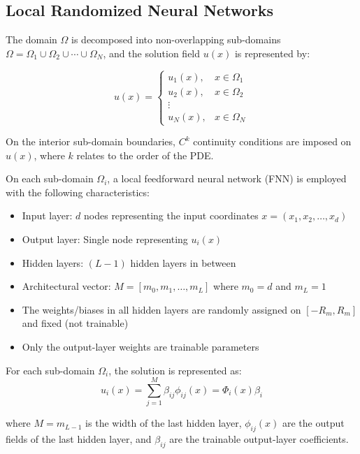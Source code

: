 \documentclass[11pt,a4paper]{article}
\begin{document}
\subsection{Local Randomized Neural Networks}

The domain $\Omega$ is decomposed into non-overlapping sub-domains $\Omega = \Omega_1 \cup \Omega_2 \cup \cdots \cup \Omega_N$, and the solution field $u(x)$ is represented by:

\begin{equation}
u(x) = \begin{cases}
u_1(x), & x \in \Omega_1 \\
u_2(x), & x \in \Omega_2 \\
\vdots \\
u_N(x), & x \in \Omega_N
\end{cases}
\end{equation}

On the interior sub-domain boundaries, $C^k$ continuity conditions are imposed on $u(x)$, where $k$ relates to the order of the PDE.

On each sub-domain $\Omega_i$, a local feedforward neural network (FNN) is employed with the following characteristics:
\begin{itemize}
    \item Input layer: $d$ nodes representing the input coordinates $x = (x_1, x_2, \ldots, x_d)$
    \item Output layer: Single node representing $u_i(x)$
    \item Hidden layers: $(L-1)$ hidden layers in between
    \item Architectural vector: $M = [m_0, m_1, \ldots, m_L]$ where $m_0 = d$ and $m_L = 1$
    \item The weights/biases in all hidden layers are randomly assigned on $[-R_m, R_m]$ and fixed (not trainable)
    \item Only the output-layer weights are trainable parameters
\end{itemize}

For each sub-domain $\Omega_i$, the solution is represented as:
\begin{equation}
u_i(x) = \sum_{j=1}^{M} \beta_{ij} \phi_{ij}(x) = \Phi_i(x) \beta_i
\end{equation}

where $M = m_{L-1}$ is the width of the last hidden layer, $\phi_{ij}(x)$ are the output fields of the last hidden layer, and $\beta_{ij}$ are the trainable output-layer coefficients.
\end{document}

